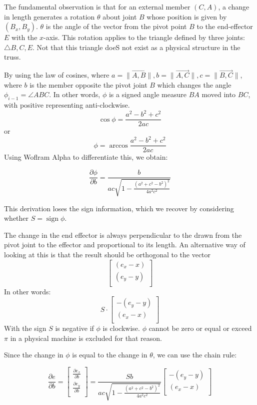 \documentclass[11pt]{article}
\DeclareMathOperator{\sign}{sign}
\begin{document}
The fundamental observation is that for an external member $(C,A)$, a change in length generates a rotation $\theta$ about joint $B$
whose position is given by $(B_x,B_y)$. $\theta$ is the angle of the vector from the pivot point $B$ to the end-effector $E$ with the $x$-axis.
This rotation applies to the triangle defined by three joints: $\triangle B,C,E$. Not that this triangle doeS not exist as a physical
structure in the truss. 

By using the law of cosines, where $a = \|\overrightarrow{A,B}\|, b = \|\overrightarrow{A,C}\|, c = \|\overrightarrow{B,C}\| $,
where $b$ is the member opposite the pivot joint $B$ which changes the angle $ \phi_{i-1} = \angle ABC $. In other words, $\phi$ is a signed angle measure
$BA$ moved into $BC$, with positive representing anti-clockwise.
\[
\cos{\phi} = \frac{a^2 - b^2 + c^2}{2 a c}
\]
or
\[
\phi = \arccos{\frac{a^2 - b^2 + c^2}{2 a c}}
\]
Using Woflram Alpha to differentiate this, we obtain:

\[
\frac{\partial \phi}{\partial b} = \frac{b}{ac\sqrt{1 - \frac{(a^2 + c^2 - b^2)^2}{4a^2c^2}}}
\]

This derivation loses the sign information, which we recover by considering whether $S = \sign{\phi}$.

The change in the end effector is always perpendicular to the drawn from the pivot joint to the effector and proportional to its length.
An alternative way of looking at this is that the result should be orthogonal to the vector
\[
\begin{bmatrix}
           (e_x  - x) \\
           (e_y - y)  \\
\end{bmatrix}
\]
In other words:
\[
S \cdot
\begin{bmatrix}
           - (e_y  - y) \\
           (e_x - x)  \\
\end{bmatrix}
\]
With the sign $S$ is negative if $\phi$ is clockwise. $\phi$ cannot be zero or equal or exceed $\pi$ in a physical machine is excluded for that reason.

Since the change in $\phi$ is equal to the change in $\theta$, we can use the chain rule:

\[
\frac{\partial e}{\partial  b} = \begin{bmatrix}
           \frac{\partial e_x}{\partial b} \\
           \frac{\partial e_y}{\partial b} \\
         \end{bmatrix} = \frac{Sb}{ac\sqrt{1 - \frac{(a^2 + c^2 - b^2)^2}{4a^2c^2}}} \begin{bmatrix}
           -(e_y -y)  \\
           (e_x - x )  \\
         \end{bmatrix}
\]
\end{document}
